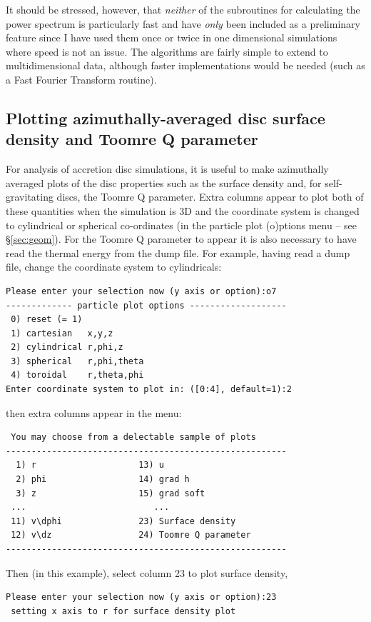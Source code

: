 \documentclass[a4paper,10pt]{article}
\begin{document}
 It should be stressed, however, that \emph{neither} of the subroutines for
calculating the power spectrum is particularly fast and have \emph{only} been included as a preliminary feature since I have used them once or twice in one dimensional simulations where speed is not an issue. The algorithms are fairly simple to extend to multidimensional
data, although faster implementations would be needed (such as a Fast
Fourier Transform routine).


\subsection{Plotting azimuthally-averaged disc surface density and Toomre Q parameter}
\label{sec:surfdens}
 For analysis of accretion disc simulations, it is useful to make azimuthally averaged plots of the disc properties such as the surface density and, for self-gravitating discs, the Toomre Q parameter. Extra columns appear to plot both of these quantities when the simulation is 3D and the coordinate system is changed to cylindrical or spherical co-ordinates (in the particle plot (o)ptions menu -- see \S\ref{sec:geom}). For the Toomre Q parameter to appear it is also necessary to have read the thermal energy from the dump file. For example, having read a dump file, change the coordinate system to cylindricals:
\begin{verbatim}
Please enter your selection now (y axis or option):o7
------------- particle plot options -------------------
 0) reset (= 1)
 1) cartesian   x,y,z       
 2) cylindrical r,phi,z     
 3) spherical   r,phi,theta 
 4) toroidal    r,theta,phi 
Enter coordinate system to plot in: ([0:4], default=1):2
\end{verbatim}
then extra columns appear in the menu:
\begin{verbatim}
 You may choose from a delectable sample of plots 
-------------------------------------------------------
  1) r                    13) u                   
  2) phi                  14) grad h              
  3) z                    15) grad soft           
 ...                         ...
 11) v\dphi               23) Surface density     
 12) v\dz                 24) Toomre Q parameter  
-------------------------------------------------------
\end{verbatim}
Then (in this example), select column 23 to plot surface density,
\begin{verbatim}
Please enter your selection now (y axis or option):23
 setting x axis to r for surface density plot
\end{verbatim}
\end{document}
